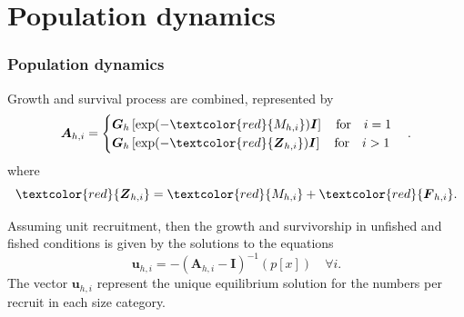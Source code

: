 \documentclass{beamer}
\begin{document}

\section{Population dynamics}


\begin{frame}
\frametitle{Population dynamics}
Growth and survival process are combined, represented by
\begin{equation*}
  \boldsymbol{A}_{h,i} =
  \begin{cases}
    \boldsymbol{G}_{h} \left[ \exp(- \textcolor{red}{M_{h,i}}) \boldsymbol{I} \right] \quad  \text{for} \quad i = 1\\
    \boldsymbol{G}_{h} \left[ \exp(-\textcolor{red}{\boldsymbol{Z}_{h,i}}) \boldsymbol{I} \right] \quad \text{for} \quad i > 1
  \end{cases}.
\end{equation*}
where
\begin{equation*}
  \textcolor{red}{\boldsymbol{Z}_{h,i}} = \textcolor{red}{M_{h,i}} +
  \textcolor{red}{\boldsymbol{F}_{h,i}}.
\end{equation*}

Assuming unit recruitment, then the growth and survivorship in unfished and
fished conditions is given by the solutions to the equations
\begin{equation*}
  \boldsymbol{u}_{h,i} = -(\boldsymbol{A}_{h,i} - \boldsymbol{I})^{-1} (p[x])
  \quad \forall i.
\end{equation*}
The vector $\boldsymbol{u}_{h,i}$ represent the unique equilibrium solution for the
numbers per recruit in each size category.
\end{frame}

\end{document}
